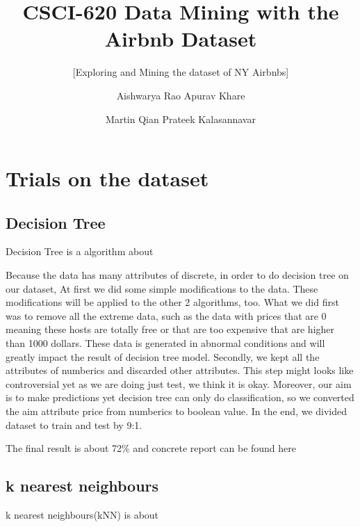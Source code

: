 \documentclass{sig-alternate}
\begin{document}
	\title{CSCI-620 Data Mining with the Airbnb Dataset}
	\subtitle{[Exploring and Mining the dataset of NY Airbnbs]}
	
	\author
	{
		\alignauthor
		Aishwarya Rao
		\alignauthor
		Apurav Khare
		\and
		\alignauthor
		Martin Qian
		\alignauthor
		Prateek Kalasannavar
	}
	
	\maketitle
	\begin{abstract}
		
	
	\end{abstract}
	
	\section{Trials on the dataset}
	\subsection{Decision Tree}
	Decision Tree is a algorithm about

	Because the data has many attributes of discrete, in order to do decision tree on our dataset, 
	At first we did some simple modifications to the data. These modifications will be applied to 
	the other 2 algorithms, too. What we did first was to remove all the extreme data, such as the data with prices
	that are 0 meaning these hosts are totally free or that are too expensive that are higher than 1000 dollars. These
	data is generated in abnormal conditions and will greatly impact the result of decision tree model.
	Secondly, we kept all the attributes of numberics and discarded other attributes. This step might looks like controversial
	yet as we are doing just test, we think it is okay. Moreover, our aim is to make predictions yet decision tree
	can only do classification, so we converted the aim attribute price from numberics to boolean value. 
	In the end, we divided dataset to train and test by 9:1. 

	The final result is about 72\% and concrete report can be found here

	\subsection{k nearest neighbours}
	k nearest neighbours(kNN) is about
\end{document}
